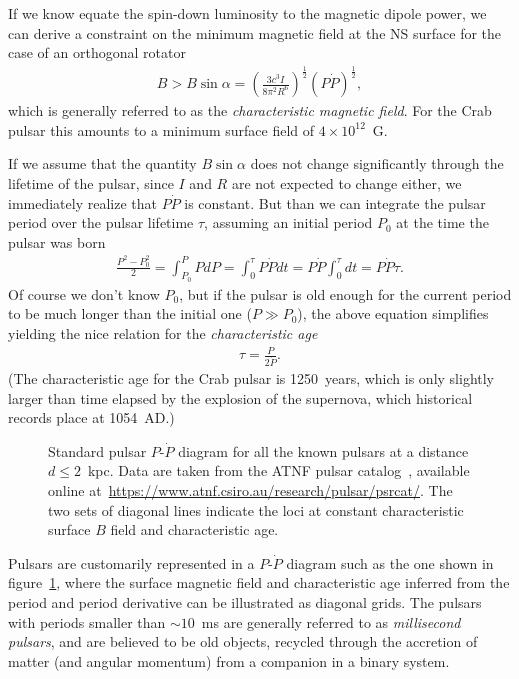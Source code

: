 If we know equate the spin-down luminosity to the magnetic dipole power, we can
derive a constraint on the minimum magnetic field at the NS surface for the case
of an orthogonal rotator
\begin{align}
  B > B\sin\alpha = \left( \frac{3c^3 I}{8\pi^2 R^6} \right)^\frac{1}{2}
  \left( P\dot{P}\right)^\frac{1}{2},
\end{align}
which is generally referred to as the \emph{characteristic magnetic field}. For the
Crab pulsar this amounts to a minimum surface field of $4 \times 10^{12}$~G.

If we assume that the quantity $B\sin\alpha$ does not change significantly through
the lifetime of the pulsar, since $I$ and $R$ are not expected to change either,
we immediately realize that $P\dot{P}$ is constant. But than we can integrate
the pulsar period over the pulsar lifetime $\tau$, assuming an initial period $P_0$
at the time the pulsar was born
\begin{align*}
  \frac{P^2 - P_0^2}{2} = \int_{P_0}^P P dP = \int_0^\tau P \dot{P} dt =
  P \dot{P} \int_0^\tau dt = P \dot{P} \tau.
\end{align*}
Of course we don't know $P_0$, but if the pulsar is old enough for the current period
to be much longer than the initial one ($P \gg P_0$), the above equation simplifies
yielding the nice relation for the \emph{characteristic age}
\begin{align}
  \tau = \frac{P}{2\dot{P}}.
\end{align}
(The characteristic age for the Crab pulsar is 1250~years, which is only slightly
larger than time elapsed by the explosion of the supernova, which historical records
place at 1054~AD.)

\begin{figure}[htbp!]
	
	\caption{Standard pulsar $P$-$\dot{P}$ diagram for all the known pulsars at a
    distance $d \le 2$~kpc. Data are taken from the ATNF pulsar
    catalog~\cite{2005AJ....129.1993M}, available online
    at~\url{https://www.atnf.csiro.au/research/pulsar/psrcat/}.
    The two sets of diagonal lines indicate the loci at constant characteristic
    surface $B$ field and characteristic age.}
  \label{fig:pulsar_ppdot}
\end{figure}

Pulsars are customarily represented in a $P$-$\dot{P}$ diagram such as the one
shown in figure~\ref{fig:pulsar_ppdot}, where the surface magnetic field and
characteristic age inferred from the period and period derivative can be illustrated
as diagonal grids. The pulsars with periods smaller than $\sim 10$~ms are generally
referred to as \emph{millisecond pulsars}, and are believed to be old objects,
recycled through the accretion of matter (and angular momentum) from a companion
in a binary system.


